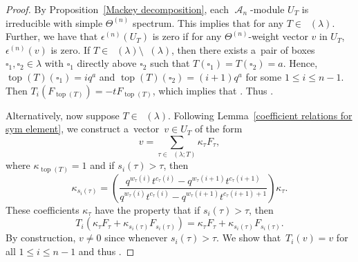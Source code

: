 \documentclass[10pt,a4paper]{amsart}
\numberwithin{equation}{section}
\theoremstyle{definition}
\DeclareMathOperator{\RYT}{\mathrm{RYT}_{\geq 0}}
\DeclareMathOperator{\PSYT}{\mathrm{PSYT}_{\geq 0}}
\DeclareMathOperator{\RSSYT}{\mathrm{RSSYT}_{\geq 0}}
\DeclareMathOperator{\sA}{\mathscr{A}}
\DeclareMathOperator{\Top}{\mathrm{top}}
\begin{document}
 \begin{proof}
 By Proposition~\ref{Mackey decomposition}, each $\sA_n$-module $U_T$ is irreducible with simple $\Theta^{(n)}$ spectrum. This implies that  for any $T \in \RYT(\lambda)$. Further, we have that $\epsilon^{(n)}(U_T)$ is zero if for any $\Theta^{(n)}$-weight vector $v$ in $U_T$, $\epsilon^{(n)}(v)$ is zero. If $T \in \RYT(\lambda) \setminus \RSSYT(\lambda)$, then there exists a~pair of boxes $\square_1,\square_2 \in \lambda$ with $\square_1$ directly above $\square_2$ such that $T(\square_1) = T(\square_2) = a$. Hence, $\Top(T)(\square_1) = iq^{a}$ and $\Top(T)(\square_2) = (i+1)q^a$ for some $1\leq i \leq n-1$. Then $T_i(F_{\Top(T)}) = -tF_{\Top(T)}$, which implies that \smash{$\epsilon^{(n)}(F_{\Top(T)}) = 0$}. Thus .

 Alternatively, now suppose $T \in \RSSYT(\lambda)$. Following Lemma~\ref{coefficient relations for sym element}, we construct a~vector~${v \in U_{T}}$ of the form
 \[
 v = \sum_{\tau \in \PSYT(\lambda;T)} \kappa_{\tau}F_{\tau},
 \]
 where $\kappa_{\Top(T)} = 1$ and if $s_i(\tau) > \tau$, then
 \[
 \kappa_{s_i(\tau)} = \left( \frac{q^{w_{\tau}(i)}t^{c_{\tau}(i)} - q^{w_{\tau}(i+1)}t^{c_{\tau}(i+1)}}{q^{w_{\tau}(i)}t^{c_{\tau}(i)} - q^{w_{\tau}(i+1)}t^{c_{\tau}(i+1)+1}} \right) \kappa_{\tau}.
 \]
 These coefficients $\kappa_{\tau}$ have the property that if $s_i(\tau) > \tau$, then
 \[
 T_i(\kappa_{\tau}F_{\tau} + \kappa_{s_i(\tau)}F_{s_i(\tau)}) = \kappa_{\tau}F_{\tau} + \kappa_{s_i(\tau)}F_{s_i(\tau)}.
 \]
 By construction, $v \neq 0$ since  whenever $s_i(\tau) > \tau$. We show that~${T_i(v) = v}$ for all $1\leq i \leq n-1$ and thus .


\end{proof}
\end{document}
